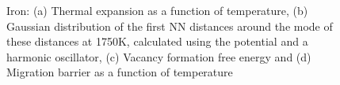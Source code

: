\documentclass{article}
\begin{document}
\begin{figure}[!htp]
\centering
{}
\hfill
{}
\hfill
\caption{Iron: (a) Thermal expansion as a function of temperature, (b) Gaussian distribution of the first NN distances around the mode of these distances at 1750K, calculated using the potential \cite{Ackland1997} and a harmonic oscillator, (c) Vacancy formation free energy and (d) Migration barrier as a function of temperature}
\label{fig:15}
\end{figure}
\end{document}
